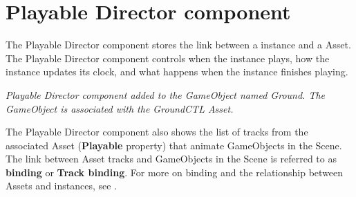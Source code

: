 \chapter{Playable Director component}
\hypertarget{md__hey_tea_9_2_library_2_package_cache_2com_8unity_8timeline_0d1_87_85_2_documentation_0i_2play__director}{}\label{md__hey_tea_9_2_library_2_package_cache_2com_8unity_8timeline_0d1_87_85_2_documentation_0i_2play__director}
\label{md__hey_tea_9_2_library_2_package_cache_2com_8unity_8timeline_0d1_87_85_2_documentation_0i_2play__director_autotoc_md4685}%
%
 The Playable Director component stores the link between a  instance and a  Asset. The Playable Director component controls when the  instance plays, how the  instance updates its clock, and what happens when the  instance finishes playing.



{\itshape Playable Director component added to the Game\+Object named Ground. The Game\+Object is associated with the Ground\+CTL  Asset.}

The Playable Director component also shows the list of tracks from the associated  Asset ({\bfseries{Playable}} property) that animate Game\+Objects in the Scene. The link between  Asset tracks and Game\+Objects in the Scene is referred to as {\bfseries{binding}} or {\bfseries{Track binding}}. For more on binding and the relationship between  Assets and  instances, see .

